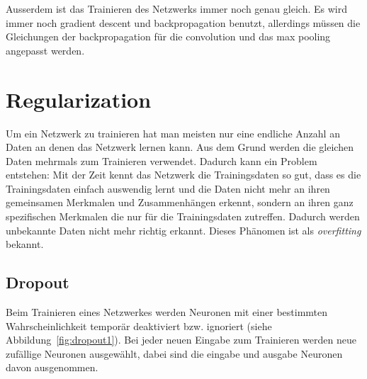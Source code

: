 \documentclass[12pt,a4paper]{report}
\begin{document}
Ausserdem ist das Trainieren des Netzwerks immer noch genau gleich.
Es wird immer noch gradient descent und backpropagation benutzt,
allerdings müssen die Gleichungen der backpropagation für die convolution und das max pooling angepasst werden.

\section{Regularization}
Um ein Netzwerk zu trainieren hat man meisten nur eine endliche Anzahl an Daten an denen das Netzwerk lernen kann.
Aus dem Grund werden die gleichen Daten mehrmals zum Trainieren verwendet.
Dadurch kann ein Problem entstehen:
Mit der Zeit kennt das Netzwerk die Trainingsdaten so gut, dass es die Trainingsdaten einfach auswendig lernt
und die Daten nicht mehr an ihren gemeinsamen Merkmalen und Zusammenhängen erkennt,
sondern an ihren ganz spezifischen Merkmalen die nur für die Trainingsdaten zutreffen.
Dadurch werden unbekannte Daten nicht mehr richtig erkannt.
Dieses Phänomen ist als \textit{overfitting} bekannt.
\subsection{Dropout}
Beim Trainieren eines Netzwerkes werden Neuronen mit einer bestimmten Wahrscheinlichkeit temporär deaktiviert bzw. ignoriert (siehe Abbildung~\ref{fig:dropout1}).
Bei jeder neuen Eingabe zum Trainieren werden neue zufällige Neuronen ausgewählt,
dabei sind die eingabe und ausgabe Neuronen davon ausgenommen.
\end{document}
